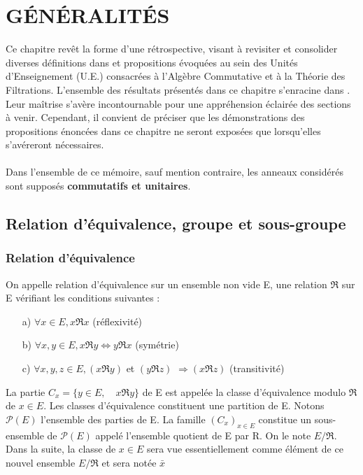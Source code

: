 \chapter{GÉNÉRALITÉS}
Ce chapitre revêt la forme d'une rétrospective, visant à revisiter et consolider diverses définitions dans \cite{Di2} et propositions évoquées au sein des Unités d'Enseignement (U.E.) consacrées à l'Algèbre Commutative et à la Théorie des Filtrations. L'ensemble des résultats présentés dans ce chapitre s'enracine dans \cite{Di3}. Leur maîtrise s'avère incontournable pour une appréhension éclairée des sections à venir. Cependant, il convient de préciser que les démonstrations des propositions énoncées dans ce chapitre ne seront exposées que lorsqu'elles s'avéreront nécessaires. \\\\ Dans l'ensemble de ce mémoire, sauf mention contraire, les anneaux considérés sont supposés \textbf{commutatifs et unitaires}.
\section{Relation d'équivalence, groupe et sous-groupe}
\subsection{Relation d'équivalence}
\begin{madefinition}
	On appelle relation d’équivalence sur un ensemble non vide E, une relation
	$\Re $ sur E vérifiant les conditions suivantes :
	\begin{enumerate}
		\item[a)] $\forall x \in E, x\Re x$ (réflexivité)
		\item[b)] $\forall x,y \in E, x\Re y \Longleftrightarrow y\Re x $ (symétrie)
		\item[c)] $\forall x,y,z \in E, (x\Re y)$ et $(y\Re z)$ $\Longrightarrow (x\Re z)$  (transitivité)
	\end{enumerate}
	La partie $C_x = \{y \in E,\quad x\Re y\}  $ de E est appelée la classe d’équivalence modulo $\Re $ de $x \in E$. Les	classes d’équivalence constituent une partition de E. Notons $\mathcal{P}(E)$ l’ensemble des parties de E. La famille $(C_x)_{x \in E}$ constitue un sous-ensemble de $\mathcal{P}(E)$ appelé l’ensemble quotient de E par R. On le note $E/\Re $. 
	Dans la suite, la classe de $x \in E$ sera vue essentiellement comme élément de ce nouvel ensemble $E/\Re $ et sera notée $\bar{x}$
\end{madefinition}

